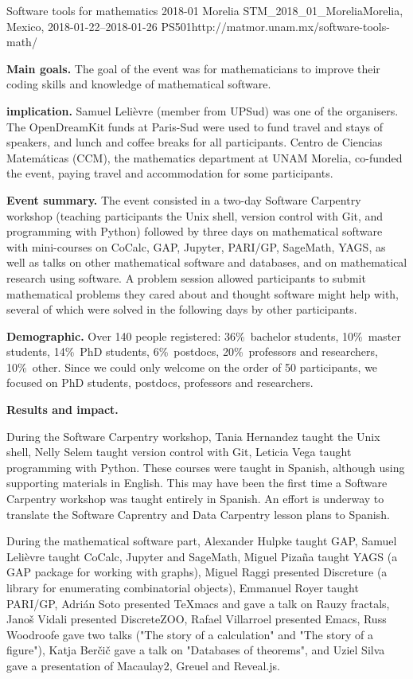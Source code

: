 \begin{event}{Software tools for mathematics 2018-01 Morelia}%
{STM_2018_01_Morelia}{Morelia, Mexico, 2018-01-22--2018-01-26}%
{PS}{50}{1}{http://matmor.unam.mx/software-tools-math/}

\textbf{Main goals.} The goal of the event was for mathematicians
to improve their coding skills and knowledge of mathematical software.

\textbf{\ODK implication.} Samuel Lelièvre (\ODK member from UPSud) was one of
the organisers. The OpenDreamKit funds at Paris-Sud were used to fund travel
and stays of speakers, and lunch and coffee breaks for all participants.
Centro de Ciencias Matemáticas (CCM), the mathematics department at
UNAM Morelia, co-funded the event, paying travel and accommodation for
some participants.

\textbf{Event summary.} The event consisted in a two-day Software Carpentry
workshop (teaching participants the Unix shell, version control with Git,
and programming with Python) followed by three days on mathematical software
with mini-courses on CoCalc, GAP, Jupyter, PARI/GP, SageMath, YAGS, as well
as talks on other mathematical software and databases, and on mathematical
research using software. A problem session allowed participants to submit
mathematical problems they cared about and thought software might help with,
several of which were solved in the following days by other participants.

\textbf{Demographic.} Over 140 people registered: 36\%\ bachelor students,
10\%\ master students, 14\%\ PhD students, 6\%\ postdocs, 20\%\ professors
and researchers, 10\%\ other. Since we could only welcome on the order of
50 participants, we focused on PhD students, postdocs, professors and
researchers.

\textbf{Results and impact.}

During the Software Carpentry workshop, Tania Hernandez taught the Unix shell,
Nelly Selem taught version control with Git, Leticia Vega taught programming
with Python. These courses were taught in Spanish, although using supporting
materials in English. This may have been the first time a Software Carpentry
workshop was taught entirely in Spanish. An effort is underway to translate
the Software Caprentry and Data Carpentry lesson plans to Spanish.

During the mathematical software part, Alexander Hulpke taught GAP, Samuel
Lelièvre taught CoCalc, Jupyter and SageMath, Miguel Pizaña taught YAGS
(a GAP package for working with graphs), Miguel Raggi presented Discreture
(a library for enumerating combinatorial objects), Emmanuel Royer taught
PARI/GP, Adrián Soto presented TeXmacs and gave a talk on Rauzy fractals,
Janoš Vidali presented DiscreteZOO, Rafael Villarroel presented Emacs,
Russ Woodroofe gave two talks ("The story of a calculation" and "The story
of a figure"), Katja Berčič gave a talk on "Databases of theorems", and
Uziel Silva gave a presentation of Macaulay2, Greuel and Reveal.js.


\end{event}
